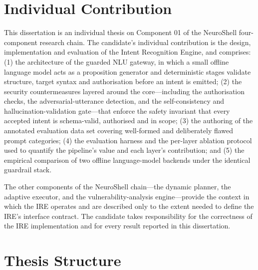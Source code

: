 \section{Individual Contribution}\label{sec:individual-contribution}

This dissertation is an individual thesis on Component 01 of the NeuroShell
four-component research chain. The candidate's individual contribution is the
design, implementation and evaluation of the Intent Recognition Engine, and
comprises: (1) the architecture of the guarded NLU gateway, in which a small
offline language model acts as a proposition generator and deterministic stages
validate structure, target syntax and authorisation before an intent is
emitted; (2) the security countermeasures layered around the core---including
the authorisation checks, the adversarial-utterance detection, and the
self-consistency and hallucination-validation gate---that enforce the safety
invariant that every accepted intent is schema-valid, authorised and in scope;
(3) the authoring of the annotated evaluation data set covering well-formed and
deliberately flawed prompt categories; (4) the evaluation harness and the
per-layer ablation protocol used to quantify the pipeline's value and each
layer's contribution; and (5) the empirical comparison of two offline
language-model backends under the identical guardrail stack.

The other components of the NeuroShell chain---the dynamic planner, the
adaptive executor, and the vulnerability-analysis engine---provide the context
in which the IRE operates and are described only to the extent needed to define
the IRE's interface contract. The candidate takes responsibility for the
correctness of the IRE implementation and for every result reported in this
dissertation.

\section{Thesis Structure}\label{sec:thesis-structure}

